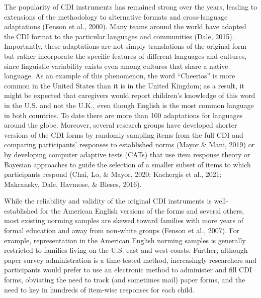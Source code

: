 \documentclass[
  english,
  ,man,floatsintext]{apa6}
\begin{document}
The popularity of CDI instruments has remained strong over the years, leading to extensions of the methodology to alternative formats and cross-language adaptations (Fenson et al., 2000). Many teams around the world have adapted the CDI format to the particular languages and communities (Dale, 2015). Importantly, these adaptations are not simply translations of the original form but rather incorporate the specific features of different languages and cultures, since linguistic variability exists even among cultures that share a native language. As an example of this phenomenon, the word ``Cheerios'' is more common in the United States than it is in the United Kingdom; as a result, it might be expected that caregivers would report children's knowledge of this word in the U.S. and not the U.K., even though English is the most common language in both countries. To date there are more than 100 adaptations for languages around the globe. Moreover, several research groups have developed shorter versions of the CDI forms by randomly sampling items from the full CDI and comparing participants' responses to established norms (Mayor \& Mani, 2019) or by developing computer adaptive tests (CATs) that use item response theory or Bayesian approaches to guide the selection of a smaller subset of items to which participants respond (Chai, Lo, \& Mayor, 2020; Kachergis et al., 2021; Makransky, Dale, Havmose, \& Bleses, 2016).

While the reliability and validity of the original CDI instruments is well-established for the American English versions of the forms and several others, most existing norming samples are skewed toward families with more years of formal education and away from non-white groups (Fenson et al., 2007). For example, representation in the American English norming samples is generally restricted to families living on the U.S. east and west coasts. Further, although paper survey administration is a time-tested method, increasingly researchers and participants would prefer to use an electronic method to administer and fill CDI forms, obviating the need to track (and sometimes mail) paper forms, and the need to key in hundreds of item-wise responses for each child.
\end{document}

